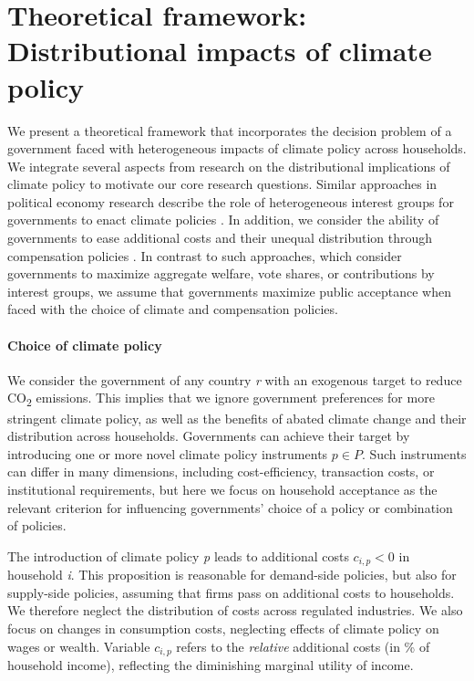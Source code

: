 \documentclass[12pt, a4paper]{article}
\begin{document}
\section{Theoretical framework: Distributional impacts of climate policy} \label{sec:literature}

We present a theoretical framework that incorporates the decision problem of a government faced with heterogeneous impacts of climate policy across households. We integrate several aspects from research on the distributional implications of climate policy to motivate our core research questions. Similar approaches in political economy research describe the role of heterogeneous interest groups for governments to enact climate policies \autocite{Aidt.1998,Fredriksson.1997}. In addition, we consider the ability of governments to ease additional costs and their unequal distribution through compensation policies \autocite{Lindbeck.1987,Aidt.2010,Cremer.2004}. In contrast to such approaches, which consider governments to maximize aggregate welfare, vote shares, or contributions by interest groups, we assume that governments maximize public acceptance \autocite[e.g.,][]{Downs.1957,Stigler.1971} when faced with the choice of climate and compensation policies. 

\paragraph{Choice of climate policy} 
We consider the government of any country \textit{r} with an exogenous target to reduce CO\textsubscript{2} emissions. This implies that we ignore government preferences for more stringent climate policy, as well as the benefits of abated climate change and their distribution across households. Governments can achieve their target by introducing one or more novel climate policy instruments $p \in P$. Such instruments can differ in many dimensions, including cost-efficiency, transaction costs, or institutional requirements, but here we focus on household acceptance as the relevant criterion for influencing governments' choice of a policy or combination of policies.

The introduction of climate policy \textit{p} leads to additional costs $c_{i,p}<0$ in household \textit{i}. This proposition is reasonable for demand-side policies, but also for supply-side policies, assuming that firms pass on additional costs to households. We therefore neglect the distribution of costs across regulated industries. We also focus on changes in consumption costs, neglecting effects of climate policy on wages or wealth. Variable $c_{i,p}$ refers to the \textit{relative} additional costs (in \% of household income), reflecting the diminishing marginal utility of income.
\end{document}

